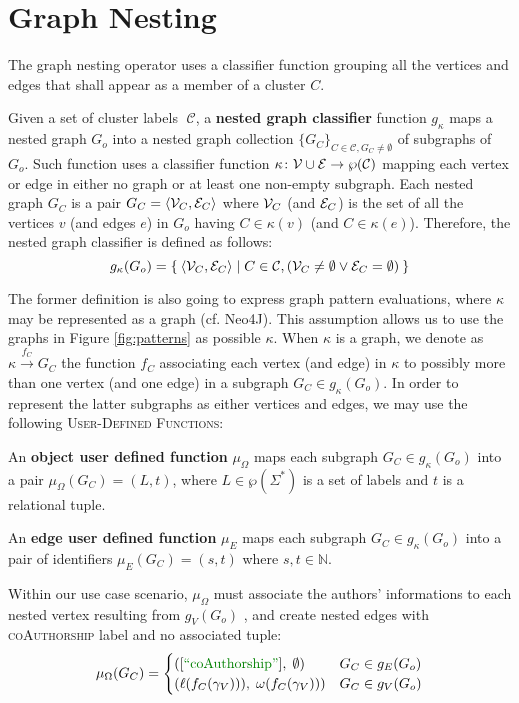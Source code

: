 \section{Graph Nesting}\label{sec:nestingdef}
The graph nesting operator uses a classifier function grouping all the vertices and edges that shall appear as a member of a cluster $C$. 

\begin{definition}
	Given a set of cluster labels $\;\mathcal{C}$, a \textbf{nested graph classifier} function $g_\kappa$ maps a nested graph $G_o$ into a nested  graph collection $\{G_C\}_{C\in\mathcal{C},G_C\neq \emptyset}$ of subgraphs of $G_o$. Such function uses a classifier function $\kappa\colon \mathcal{V}\cup \mathcal{E}\to \wp(\mathcal{C})$ mapping each vertex or edge in either no graph or at least one non-empty subgraph. Each nested graph $G_C$ is a pair
	$G_C=\Braket{\mathcal{V}_C,\mathcal{E}_C}$
	where $\mathcal{V}_C$ (and $\mathcal{E}_C$) is the set of all the vertices $v$ (and edges $e$) in $G_o$ having $C\in \kappa(v)$ (and $C\in \kappa(e)$). Therefore, the nested graph classifier is defined as follows:
	\[g_\kappa(G_o)=\Set{\Braket{\mathcal{V}_C,\mathcal{E}_C}|C\in\mathcal{C},(\mathcal{V}_C\neq\emptyset\vee\mathcal{E}_C=\emptyset)}\]
\end{definition}

The former definition is also going to express graph pattern evaluations, where $\kappa$ may be represented as a graph (cf. Neo4J). This assumption allows us to use the graphs in Figure \ref{fig:patterns} as possible $\kappa$. When $\kappa$ is a graph, we denote as $\kappa\xrightarrow{f_C} G_C$ the function $f_C$ associating  each vertex (and edge) in $\kappa$ to possibly more than one vertex (and one edge) in a subgraph $G_C\in g_\kappa(G_o)$. In order to represent the latter subgraphs  as either vertices and edges, we may use
the following \textsc{User-Defined Functions}:
\begin{definition}
	An \textbf{object user defined function} $\mu_\Omega$ maps each subgraph $G_C\in g_\kappa(G_o)$ into a pair $\mu_\Omega(G_C)=(L,t)$, where $L\in\wp(\Sigma^*)$ is a set of labels and $t$ is a relational tuple.
	
	An \textbf{edge user defined function} $\mu_E$ maps each subgraph $G_C\in g_\kappa(G_o)$ into a pair of identifiers $\mu_E(G_C)=(s,t)$ where $s,t\in\mathbb{N}$.
\end{definition}

\begin{ex}
Within our use case scenario, $\mu_\Omega$  must associate  the authors' informations to each nested vertex resulting from $g_{V}(G_{o})$ , and create nested edges with \textsc{coAuthorship} label and no associated tuple:
\[\mu_\Omega(G_C)=\begin{cases}
([\mstr{coAuthorship}],\;\emptyset) & G_C \in g_E(G_{o})\\
(\ell(f_C(\gamma_V))),\;\omega(f_C(\gamma_V))) & G_C \in g_V(G_{o})\\
\end{cases}\]
\end{ex}


